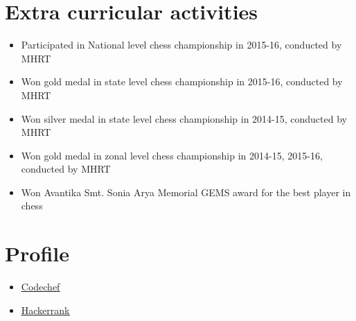 \documentclass[letterpaper,11pt]{article}
\newcommand{\resumeItem}[1]{
  \item\small{
    {#1 \vspace{-2pt}}
  }
}
\newcommand{\resumeItemListStart}{\begin{itemize}}
\newcommand{\resumeItemListEnd}{\end{itemize}\vspace{-5pt}}
\begin{document}
 \section{Extra curricular activities}
 \begin{itemize}[leftmargin=0.15in, label={}]
            \resumeItemListStart
            \resumeItem{Participated in National level chess championship in 2015-16, conducted by MHRT}
            \resumeItem{Won gold medal in state level chess championship in 2015-16, conducted by MHRT}
            \resumeItem{Won silver medal in state level chess championship in 2014-15, conducted by MHRT}
            \resumeItem{Won gold medal in zonal level chess championship in 2014-15, 2015-16, conducted by MHRT}
            \resumeItem{Won Avantika Smt. Sonia Arya Memorial GEMS award for the best player in chess}
            
          \resumeItemListEnd
 \end{itemize}
  \section{Profile}
 \begin{itemize}[leftmargin=0.15in, label={}]
            \resumeItemListStart
            
            \resumeItem{\href{https://www.codechef.com/users/tannu_kumari}{\underline{Codechef}}}
            \resumeItem{\href{https://www.hackerrank.com/tannuchoudhary10}{\underline{Hackerrank}}}
            
            
            
          \resumeItemListEnd
 \end{itemize}
\end{document}
